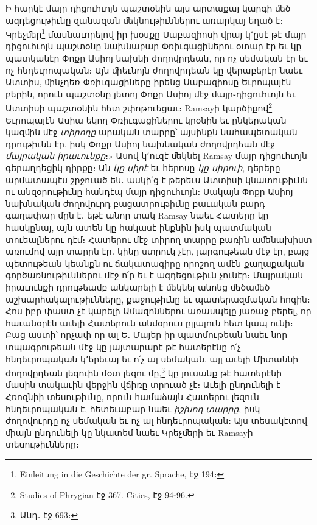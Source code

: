 \documentclass{article}
\begin{document}
{Ի հարկէ մայր դիցուհւոյն պաշտօնին այս արտաքայ կարգի ﬔծ ազդեցութիւնը զանազան ﬔկնութիւններու առարկայ եղած է։ Կրեչﬔր\footnote{Einleitung in die Geschichte der gr. Sprache, էջ 194։} մասնաւորելով իր խօսքը Սաբազիոսի վրայ կ՚ըսէ թէ մայր դիցուհւոյն պաշտօնը նախնաբար Փռիւգացիներու օտար էր եւ կը պատկանէր Փոքր Ասիոյ նախնի ժողովրդեան, որ ոչ սեմական էր եւ ոչ հնդեւրոպական։ Այն ﬕեւնոյն ժողովրդեան կը վերաբերէր նաեւ Ատտիս, ﬕնչդեռ Փռիւգացիները իրենց Սաբազիոսը Եւրոպայէն բերին, որուն պաշտօնը յետոյ Փոքր Ասիոյ մէջ մայր֊դիցուհւոյն եւ Ատտիսի պաշտօնին հետ շփոթուեցաւ։ Ramsayի կարծիքով\footnote{Studies of Phrygian էջ 367. Cities, էջ 94֊96.} Եւրոպայէն Ասիա եկող Փռիւգացիներու կրօնին եւ ընկերական կազﬕն մէջ \emph{տիրողը} արական տարրը՝ այսինքն նահապետական դրութիւնն էր, իսկ Փոքր Ասիոյ նախնական ժողովրդեան մէջ \emph{մայրական իրաւունքը}։» Ասով կ՚ուզէ ﬔկնել Ramsay մայր դիցուհւոյն գերաղդեցիկ դիրքը։ Ան \emph{կը սիրէ} եւ հերոսը \emph{կը սիրուի}, դերերը արմատապէս շրջուած են․ ասկի՛ց է թերեւս Ատտիսի կնատութիւնն ու անզօրութիւնը հանդէպ մայր դիցուհւոյն։ Սակայն Փոքր Ասիոյ նախնական ժողովուրդ բացատրութիւնը բաւական բարդ գաղափար մըն է․ եթէ անոր տակ Ramsay նաեւ Հատերը կը հասկընայ, այն ատեն կը հակասէ ինքնին իսկ պատմական տուեալներու դէմ։ Հատերու մէջ տիրող տարրը բառին աﬔնախիստ առումով այր տարրն էր․ կինը ստրուկ չէր, յարգութեան մէջ էր, բայց պետութեան կեանքն ու ճակատագիրը որոշող ամէն քաղաքական գործառնութիւններու մէջ ո՛ր եւ է ազդեցութիւն չունէր։ Մայրական իրաւունքի դրութեամբ անկարելի է ﬔկնել անոնց ﬔծաﬔծ աշխարհակալութիւնները, քաջութիւնը եւ պատերազմական հոգին։ Հոս իբր փաստ չէ կարելի Ամազոններու առասպելը յառաջ բերել, որ հաւանօրէն աւելի Հատերուն անմօրուս ըլլալուն հետ կապ ունի։ Բաց աստի՝ որչափ որ ալ Ե․ Մայեր իր պատմութեան նաեւ նոր տպագրութեան մէջ կը յայտարարէ թէ հատերէնը ո՛չ հնդեւրոպական կ՚երեւայ եւ ո՛չ ալ սեմական, այլ աւելի Միտաննի ժողովըդեան լեզուին մօտ լեզու մը,\footnote{Անդ․ էջ 693։} կը յուսանք թէ հատերէնի մասին տակաւին վերջին վճիռը տրուած չէ։ Աւելի ընդունելի է Հռոզնիի տեսութիւնը, որուն համաձայն Հատերու լեզուն հնդեւրոպական է, հետեւաբար նաեւ \emph{իշխող տարրը}, իսկ ժողովուրդը ոչ սեմական եւ ոչ ալ հնդեւրոպական։ Այս տեսակէտով ﬕայն ընդունելի կը նկատեմ նաեւ Կրեչﬔրի եւ Ramsayի տեսութիւնները։

}
\end{document}
